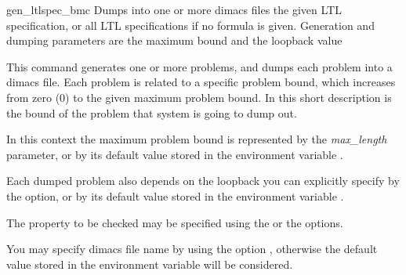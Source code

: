 \begin{nusmvCommand} {gen\_ltlspec\_bmc} {Dumps into one or more dimacs files the given LTL specification, or all LTL specifications if no formula is given. Generation and dumping parameters are the maximum bound and the loopback value}


This command generates one or more problems, and  dumps each problem
into a dimacs file. Each problem is related to a specific problem
bound, which increases from zero (0) to the given maximum problem
bound. In this short description  is the bound of the
problem that system is going to dump out. 

In this context the maximum problem bound is represented by the {\it
max\_length} parameter, or by its default value stored in the
environment variable .

Each dumped problem also depends on the loopback you can explicitly
specify by the  option, or by its default value stored
in the environment variable .

The property to be checked may be specified using the  or the  options.

You may specify dimacs file name by using the option , otherwise the default value stored in the environment
variable  will be considered.

\begin{cmdOpt}

            

       

\end{cmdOpt}
\end{nusmvCommand}
